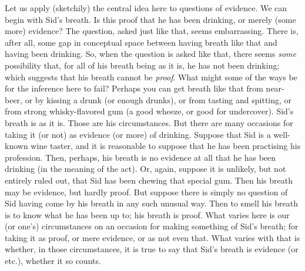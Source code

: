 Let us apply (sketchily) the central idea here to questions of evidence. We can begin with Sid’s breath. Is this proof that he has been drinking, or merely (some more) evidence? The question, asked just like that, seems embarrassing. There is, after all, some gap in conceptual space between having breath like that and having been drinking. So, when the question is asked like that, there seems \emph{some} possibility that, for all of his breath being as it is, he has not been drinking; which suggests that his breath cannot be \emph{proof}. What might some of the ways be for the inference here to fail? Perhaps you can get breath like that from near-beer, or by kissing a drunk (or enough drunks), or from tasting and spitting, or from strong whisky-flavored gum (a good wheeze, or good for undercover). Sid’s breath is as it is. Those are his circumstances. But there are many occasions for taking it (or not) as evidence (or more) of drinking. Suppose that Sid is a well-known wine taster, and it is reasonable to suppose that he has been practising his profession. Then, perhaps, his breath is no evidence at all that he has been drinking (in the meaning of the act). Or, again, suppose it is unlikely, but not entirely ruled out, that Sid has been chewing that special gum. Then his breath may be evidence, but hardly proof. But suppose there is simply no question of Sid having come by his breath in any such unusual way. Then to smell his breath is to know what he has been up to; his breath is proof. What varies here is our (or one's) circumstances on an occasion for making something of Sid's breath; for taking it as proof, or mere evidence, or as not even that. What varies with that is whether, in those circumstances, it is true to say that Sid's breath is evidence (or etc.), whether it so counts.

